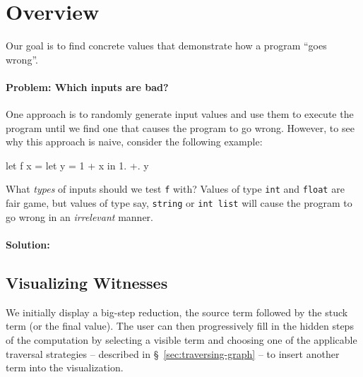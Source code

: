 \section{Overview}
\label{sec:overview}


Our goal is to find concrete values that demonstrate how a
program ``goes wrong''.

\paragraph{Problem: Which inputs are bad?}
%
One approach is to randomly generate input values and use
them to execute the program until we find one that causes
the program to go wrong. However, to see why this approach
is naive, consider the following example:
%
\begin{code}
  let f x =
    let y = 1 + x in
      1. +. y
\end{code}
%
What \emph{types} of inputs should we test \texttt{f} with?
Values of type \texttt{int} and \texttt{float} are fair game,
but values of type say, \texttt{string} or \texttt{int list}
will cause the program to go wrong in an \emph{irrelevant}
manner.

\paragraph{Solution:} 


\subsection{Visualizing Witnesses}
\label{sec:visual-witness}
We initially display a big-step reduction, \ie the source term followed
by the stuck term (or the final value).
%
The user can then progressively fill in the hidden steps of the
computation by selecting a visible term and choosing one of the
applicable traversal strategies -- described in
\S~\ref{sec:traversing-graph} -- to insert another term into the
visualization.

